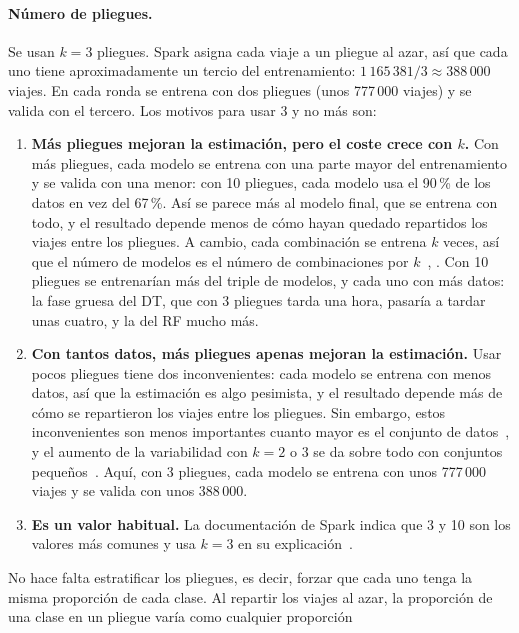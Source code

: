 \documentclass[12pt,a4paper]{article}
\begin{document}
\paragraph{Número de pliegues.} Se usan $k = 3$ pliegues. Spark asigna cada
viaje a un pliegue al azar, así que cada uno tiene aproximadamente un tercio
del entrenamiento: $1\,165\,381 / 3 \approx 388\,000$ viajes. En cada ronda
se entrena con dos pliegues (unos 777\,000 viajes) y se valida con el
tercero. Los motivos para usar 3 y no más son:
\begin{enumerate}
    \item \textbf{Más pliegues mejoran la estimación, pero el coste crece
    con $k$.} Con más pliegues, cada modelo se entrena con una parte mayor
    del entrenamiento y se valida con una menor: con 10 pliegues, cada
    modelo usa el 90\,\% de los datos en vez del 67\,\%. Así se parece más al
    modelo final, que se entrena con todo, y el resultado depende menos de
    cómo hayan quedado repartidos los viajes entre los pliegues. A cambio,
    cada combinación se entrena $k$ veces, así que el número de modelos es
    el número de combinaciones por $k$~\cite{spark_tuning}, \cite[cap.~6]{raschka2022}. Con 10 pliegues
    se entrenarían más del triple de modelos, y cada uno con más datos: la
    fase gruesa del \ac{DT}, que con 3 pliegues tarda una hora, pasaría a
    tardar unas cuatro, y la del \ac{RF} mucho más.
    \item \textbf{Con tantos datos, más pliegues apenas mejoran la
    estimación.} Usar pocos pliegues tiene dos inconvenientes: cada modelo
    se entrena con menos datos, así que la estimación es algo pesimista, y
    el resultado depende más de cómo se repartieron los viajes entre los
    pliegues. Sin embargo, estos inconvenientes son menos importantes
    cuanto mayor es el conjunto de datos~\cite[sec.~3.5]{raschka2018}, y el
    aumento de la variabilidad con $k = 2$ o $3$ se da sobre todo con
    conjuntos pequeños~\cite[sec.~3.6]{raschka2018}. Aquí, con 3 pliegues,
    cada modelo se entrena con unos 777\,000 viajes y se valida con unos
    388\,000.
    \item \textbf{Es un valor habitual.} La documentación de Spark indica
    que 3 y 10 son los valores más comunes y usa $k = 3$ en su
    explicación~\cite{spark_tuning}.
\end{enumerate}
No hace falta estratificar los pliegues, es decir, forzar que cada uno
tenga la misma proporción de cada clase. Al repartir los viajes al azar, la
proporción de una clase en un pliegue varía como cualquier proporción
\end{document}
